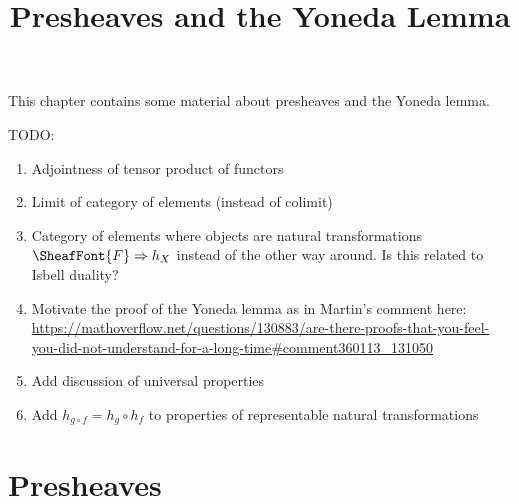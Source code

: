 

%



\title{Presheaves and the Yoneda Lemma}

\maketitle

\label{section-phantom}

This chapter contains some material about presheaves and the Yoneda lemma.

TODO:
\begin{enumerate}
    \item Adjointness of tensor product of functors
    \item Limit of category of elements (instead of colimit)
    \item Category of elements where objects are natural transformations $\SheafFont{F}\Rightarrow h_{X}$ instead of the other way around. Is this related to Isbell duality?
    \item Motivate the proof of the Yoneda lemma as in Martin's comment here: \url{https://mathoverflow.net/questions/130883/are-there-proofs-that-you-feel-you-did-not-understand-for-a-long-time#comment360113_131050}
    \item Add discussion of universal properties
    \item Add $h_{g\circ f}=h_{g}\circ h_{f}$ to properties of representable natural transformations
\end{enumerate}

\ChapterTableOfContents

\section{Presheaves}\label{section-presheaves}

